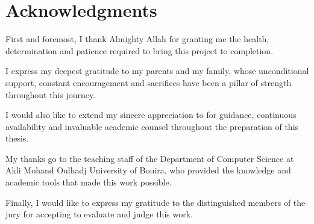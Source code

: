 \chapter*{Acknowledgments}


\noindent
First and foremost, I thank Almighty Allah for granting me the health,
determination and patience required to bring this project to completion.

\medskip\noindent
I express my deepest gratitude to my parents and my family, whose
unconditional support, constant encouragement and sacrifices have been a pillar
of strength throughout this journey.

\medskip\noindent
I would also like to extend my sincere appreciation to \thesissupervisor{} for
guidance, continuous availability and invaluable academic counsel throughout
the preparation of this thesis.

\medskip\noindent
My thanks go to the teaching staff of the Department of Computer Science at
Akli Mohand Oulhadj University of Bouira, who provided the knowledge and
academic tools that made this work possible.

\medskip\noindent
Finally, I would like to express my gratitude to the distinguished members of
the jury for accepting to evaluate and judge this work.
